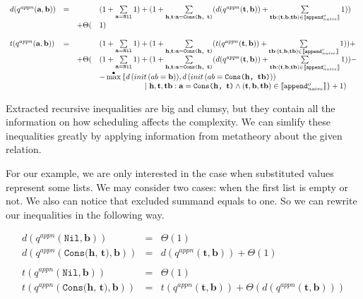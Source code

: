 \[
\begin{array}{lcll}
d(q^{appn}(\mathbf{a}, \mathbf{b})) & = & & (1 + \sum\limits_{\mathbf{a} = \texttt{Nil}} 1) + (1 + \sum\limits_{\mathbf{h}, \mathbf{t}: \mathbf{a} = \texttt{Cons($\mathbf{h}$, $\mathbf{t}$)}} (d(q^{appn}(\mathbf{t}, \mathbf{b})) + \sum\limits_{\mathbf{tb} : (\mathbf{t}, \mathbf{b}, \mathbf{tb}) \in \llbracket \texttt{append$^o_{naive}$} \rrbracket} 1)) \\
& & + \Theta( & 1) \\
\\
t(q^{appn}(\mathbf{a}, \mathbf{b})) & = & & (1 + \sum\limits_{\mathbf{a} = \texttt{Nil}} 1) + (1 + \sum\limits_{\mathbf{h}, \mathbf{t}: \mathbf{a} = \texttt{Cons($\mathbf{h}$, $\mathbf{t}$)}} (t(q^{appn}(\mathbf{t}, \mathbf{b})) + \sum\limits_{\mathbf{tb} : (\mathbf{t}, \mathbf{b}, \mathbf{tb}) \in \llbracket \texttt{append$^o_{naive}$} \rrbracket} 1)) + \\
& & + \Theta( & (1 + \sum\limits_{\mathbf{a} = \texttt{Nil}} 1) + (1 + \sum\limits_{\mathbf{h}, \mathbf{t}: \mathbf{a} = \texttt{Cons($\mathbf{h}$, $\mathbf{t}$)}} (d(q^{appn}(\mathbf{t}, \mathbf{b})) + \sum\limits_{\mathbf{tb} : (\mathbf{t}, \mathbf{b}, \mathbf{tb}) \in \llbracket \texttt{append$^o_{naive}$} \rrbracket} 1)) - \\
& & &  - \max^{\bullet}\limits{} \{ d\,(init\,(ab \equiv \mathbf{b})), d\,(init\,(ab \equiv \texttt{Cons($\mathbf{h}$, $\mathbf{tb}$)})) \\
& & & \qquad \qquad  \qquad  \mid \mathbf{h}, \mathbf{t}, \mathbf{tb}: \mathbf{a} = \texttt{Cons($\mathbf{h}$, $\mathbf{t}$)} \land (\mathbf{t}, \mathbf{b}, \mathbf{tb}) \in \llbracket \texttt{append$^o_{naive}$} \rrbracket \} + 1) 
\end{array}
\]


Extracted recursive inequalities are big and clumsy, but they contain all the information on how scheduling affects the complexity. We can simlify these inequalities greatly by applying information from metatheory about the given relation.

For our example, we are only interested in the case when substituted values represent some lists. We may consider two cases: when the first list is empty or not. We also can notice that excluded summand equals to one. So we can rewrite our inequalities in the following way.

\[
\begin{array}{lcl}
d(q^{appn}(\texttt{Nil}, \mathbf{b})) & = & \Theta(1) \\
d(q^{appn}(\texttt{Cons($\mathbf{h}$, $\mathbf{t}$)}, \mathbf{b})) & = & d(q^{appn}(\mathbf{t}, \mathbf{b})) + \Theta(1) \\
\\
t(q^{appn}(\texttt{Nil}, \mathbf{b})) & = & \Theta(1) \\
t(q^{appn}(\texttt{Cons($\mathbf{h}$, $\mathbf{t}$)}, \mathbf{b})) & = & t(q^{appn}(\mathbf{t}, \mathbf{b})) + \Theta(d(q^{appn}(\mathbf{t}, \mathbf{b}))) \\
\end{array}
 \]
 
